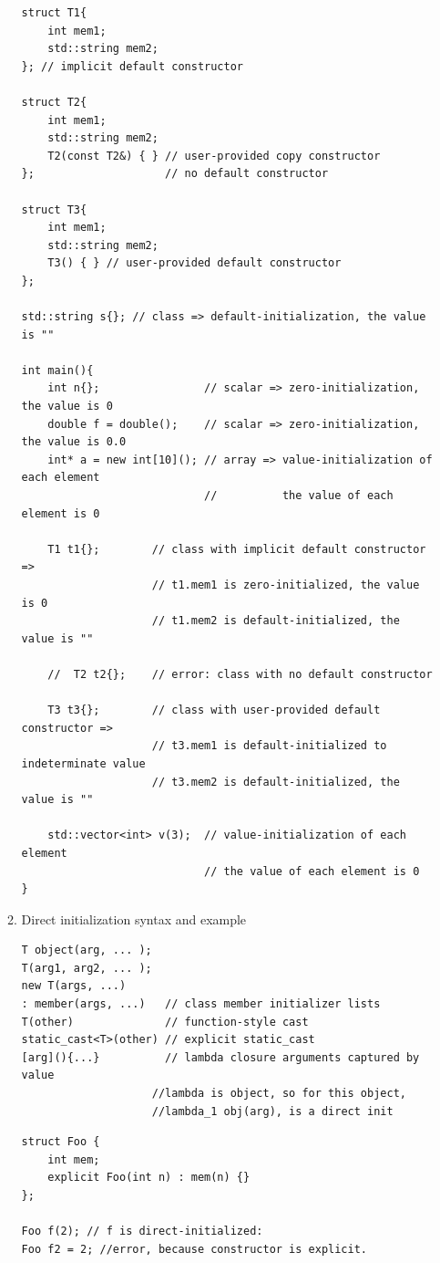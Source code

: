 \documentclass[a4paper,11pt,twoside]{book}
\begin{document}
\begin{itemize}
\begin{enumerate}
\begin{lstlisting}
struct T1{
	int mem1;
	std::string mem2;
}; // implicit default constructor

struct T2{
	int mem1;
	std::string mem2;
	T2(const T2&) { } // user-provided copy constructor
};                    // no default constructor

struct T3{
	int mem1;
	std::string mem2;
	T3() { } // user-provided default constructor
};

std::string s{}; // class => default-initialization, the value is ""

int main(){
	int n{};                // scalar => zero-initialization, the value is 0
	double f = double();    // scalar => zero-initialization, the value is 0.0
	int* a = new int[10](); // array => value-initialization of each element
							//          the value of each element is 0
							
	T1 t1{};		// class with implicit default constructor =>
					// t1.mem1 is zero-initialized, the value is 0
					// t1.mem2 is default-initialized, the value is ""
							
	//  T2 t2{};	// error: class with no default constructor
	
	T3 t3{};		// class with user-provided default constructor =>
					// t3.mem1 is default-initialized to indeterminate value
					// t3.mem2 is default-initialized, the value is ""
							
	std::vector<int> v(3);  // value-initialization of each element
							// the value of each element is 0
}
\end{lstlisting}


		\item Direct initialization syntax and example
\begin{lstlisting}[numbers=none]
T object(arg, ... );
T(arg1, arg2, ... );
new T(args, ...)
: member(args, ...)   // class member initializer lists
T(other)              // function-style cast
static_cast<T>(other) // explicit static_cast
[arg](){...}          // lambda closure arguments captured by value
					//lambda is object, so for this object, 
					//lambda_1 obj(arg), is a direct init
\end{lstlisting}


\begin{lstlisting}[numbers=none]
struct Foo {
	int mem;
	explicit Foo(int n) : mem(n) {}
};

Foo f(2); // f is direct-initialized:
Foo f2 = 2; //error, because constructor is explicit.
\end{lstlisting}



\end{enumerate}
\end{itemize}
\end{document}
